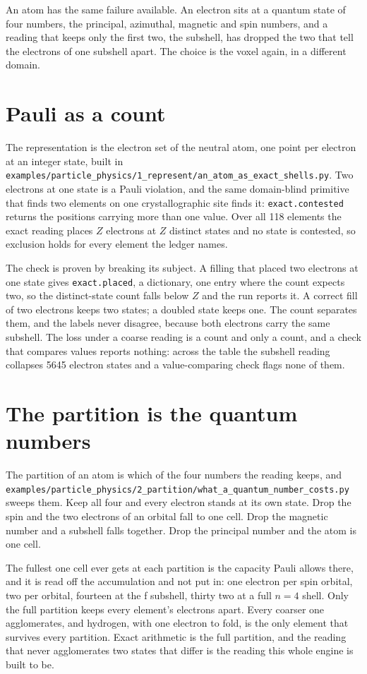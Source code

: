 An atom has the same failure available. An electron sits at a quantum state of four numbers, the
principal, azimuthal, magnetic and spin numbers, and a reading that keeps only the first two, the
subshell, has dropped the two that tell the electrons of one subshell apart. The choice is the
voxel again, in a different domain.

\section{Pauli as a count}

The representation is the electron set of the neutral atom, one point per electron at an integer
state, built in
\texttt{examples/\allowbreak{}particle\_physics/\allowbreak{}1\_represent/\allowbreak{}an\_atom\_as\_exact\_shells.py}.
Two electrons at one state is a Pauli violation, and the same domain-blind primitive that finds two
elements on one crystallographic site finds it: \texttt{exact.contested} returns the positions
carrying more than one value. Over all 118 elements the exact reading places $Z$ electrons at $Z$
distinct states and no state is contested, so exclusion holds for every element the ledger names.

The check is proven by breaking its subject. A filling that placed two electrons at one state gives
\texttt{exact.placed}, a dictionary, one entry where the count expects two, so the distinct-state
count falls below $Z$ and the run reports it. A correct fill of two electrons keeps two states; a
doubled state keeps one. The count separates them, and the labels never disagree, because both
electrons carry the same subshell. The loss under a coarse reading is a count and only a count, and a
check that compares values reports nothing: across the table the subshell reading collapses 5645
electron states and a value-comparing check flags none of them.

\section{The partition is the quantum numbers}

The partition of an atom is which of the four numbers the reading keeps, and
\texttt{examples/\allowbreak{}particle\_physics/\allowbreak{}2\_partition/\allowbreak{}what\_a\_quantum\_number\_costs.py}
sweeps them. Keep all four and every electron stands at its own state. Drop the spin and the two
electrons of an orbital fall to one cell. Drop the magnetic number and a subshell falls together.
Drop the principal number and the atom is one cell.

The fullest one cell ever gets at each partition is the capacity Pauli allows there, and it is read
off the accumulation and not put in: one electron per spin orbital, two per orbital, fourteen at
the f subshell, thirty two at a full $n = 4$ shell. Only the full partition keeps every element's
electrons apart. Every coarser one agglomerates, and hydrogen, with one electron to fold, is the only
element that survives every partition. Exact arithmetic is the full partition, and the reading that
never agglomerates two states that differ is the reading this whole engine is built to be.
